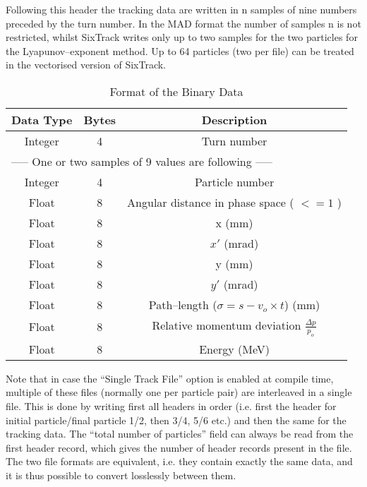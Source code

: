\documentclass[a4paper,11pt]{report}
\begin{document}
\clearpage

Following this header the tracking data are written in n samples of
nine numbers preceded by the turn number. In the MAD format the number
of samples n is not restricted, whilst SixTrack writes only up to two
samples for the two particles for the Lyapunov--exponent method. Up to
64 particles (two per file) can be treated in the vectorised version
of SixTrack\@.

\begin{table}[h]
\caption{Format of the Binary Data}
\label{T-FBD}
\centering
\begin{tabular}{|c|c|c|}
  \hline
  {\bf Data Type} & {\bf Bytes} & {\bf Description} \\
  \hline
  Integer & 4 & Turn number \\
  \hline \multicolumn{3}{|l|}{----- One or two samples of 9 values are
    following -----}
  \\
  \hline
  Integer & 4 & Particle number \\
  \hline
  Float & 8 & Angular distance in phase space ( $ <= 1 $ ) \\
  \hline
  Float & 8 & x (mm) \\
  \hline
  Float & 8 & $x'$ (mrad)\\
  \hline
  Float & 8 & y (mm) \\
  \hline
  Float & 8 & $y'$ (mrad) \\
  \hline
  Float & 8 & Path--length ($\sigma = s - v_o \times t$) (mm) \\
  \hline Float & 8 & Relative momentum deviation \mbox{$ \frac{\Delta
      p}{p_o}
    $}\\
  \hline
  Float & 8 & Energy (MeV) \\
  \hline
\end{tabular}
\end{table}

Note that in case the ``Single Track File'' option is enabled at compile time, multiple of these files (normally one per particle pair) are interleaved in a single file.
This is done by writing first all headers in order (i.e. first the header for initial particle/final particle 1/2, then 3/4, 5/6 etc.) and then the same for the tracking data.
The ``total number of particles'' field can always be read from the first header record, which gives the number of header records present in the file.
The two file formats are equivalent, i.e. they contain exactly the same data, and it is thus possible to convert losslessly between them.
\end{document}
